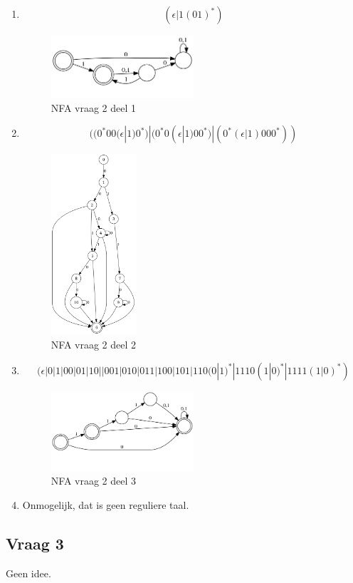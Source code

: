\documentclass[main.tex]{subfiles}
\begin{document}
\begin{enumerate}
\item
  \[ (\epsilon|1(01)^{*}) \]

  \begin{figure}[H]
    \centering
    \includegraphics[width=0.5\textwidth]{assets/oz1v2-1.png}
    \caption{NFA vraag 2 deel 1}
    \label{fig:oz1v2-1}
  \end{figure}

\item
  \[ ((0^{*}00(\epsilon|1)0^{*})|(0^{*}0(\epsilon|1)00^{*})|(0^{*}(\epsilon|1)000^{*})) \]
  \begin{figure}[H]
    \centering
    \includegraphics[width=0.3\textwidth]{assets/oz1v2-2.png}
    \caption{NFA vraag 2 deel 2}
    \label{fig:oz1v2-2}
  \end{figure}

\item 
  \[ (\epsilon|0|1|00|01|10||001|010|011|100|101|110(0|1)^{*}|1110(1|0)^{*}|1111(1|0)^{*}) \]
  \begin{figure}[H]
    \centering
    \includegraphics[width=0.5\textwidth]{assets/oz1v2-3.png}
    \caption{NFA vraag 2 deel 3}
    \label{fig:oz1v2-3}
  \end{figure}

\item Onmogelijk, dat is geen reguliere taal.
\end{enumerate}

\subsection*{Vraag 3}
Geen idee.
\end{document}
